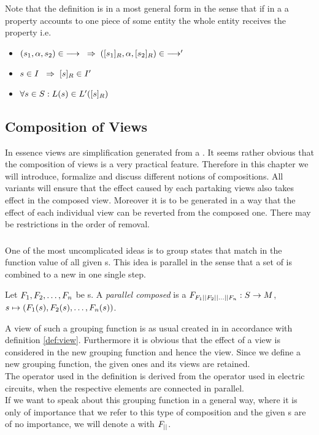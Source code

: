\documentclass[preview]{standalone}
\begin{document}
Note that the definition is in a most general form in the sense that if in a \viewN a property accounts to one piece of some entity the whole entity receives the property i.e. 
\begin{itemize}	
	\item $({s}_1, {\alpha}, {s}_2) \in {\longrightarrow} {\hspace{3mm}\Rightarrow\hspace{2mm}} ({{[{s}_1]_{{R}}}}, {\alpha}, {{[{s}_2]_{{R}}}}) \in {\longrightarrow}'$
	\item ${s} \in {I} {\hspace{3mm}\Rightarrow\hspace{2mm}} {\ensuremath{{[{s}]_{{R}}}}} \in {I}'$
	\item $\forall {s} \in {S} : {L}({s}) \in {L}'({{[{s}]_{{R}}}})$
\end{itemize}

\subsection{Composition of Views}
In essence views are simplification generated from a \chosengraphtypeN. It seems rather obvious that the composition of views is a very practical feature. Therefore in this chapter we will introduce, formalize and discuss different notions of compositions. All variants will ensure that the effect caused by each partaking views also takes effect in the composed view. Moreover it is to be generated in a way that the effect of each individual view can be reverted from the composed one. There may be restrictions in the order of removal.

\subsubsection{\parllcompNCC}
One of the most uncomplicated ideas is to group states that match in the function value of all given \grpfctN s. This idea is parallel in the sense that a set of \grpfctN is combined to a new \grpfctN in one single step.
\begin{definition}
	Let ${F}_1, {F}_2, \dots, {F}_n$ be \grpfctN s. A \emph{parallel composed \grpfctN} is a \grpfctN ${F}_{{F}_1 {||} {F}_2 {||} \dots {||} {F}_n}: {S} \to {M}$, ${s} \mapsto ({F}_1({s}), {F}_2({s}), \dots, {F}_n({s}))$.
		
\end{definition}

A view of such a grouping function is as usual created in in accordance with definition \ref{def:view}. Furthermore it is obvious that the effect of a view is considered in the new grouping function and hence the view.
Since we define a new grouping function, the given ones and its views are retained. \\
The operator \pll used in the definition is derived from the operator used in electric circuits, when the respective elements are connected in parallel. \\
If we want to speak about this grouping function in a general way, where it is only of importance that we refer to this type of composition and the given \grpfctN s are of no importance, we will denote a \emph{\parllcompN \grpfctN} with ${F}_{{||}}$. \\
\end{document}
